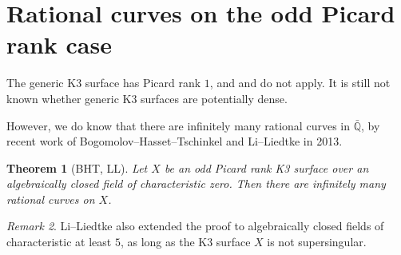 \documentclass{amsart}
\theoremstyle{plain}
\newtheorem{theorem}{Theorem}[section]
\theoremstyle{definition}
\theoremstyle{remark}
\newtheorem{remark}[theorem]{Remark}
\begin{document}

\section{Rational curves on the odd Picard rank case} %
\label{sec:rational_curves_on_the_odd_picard_rank_case}

The generic K3 surface has Picard rank $1$, and  and 
 do not apply. It is still not known whether 
generic K3 surfaces are potentially dense.

However, we do know that there are infinitely many rational curves in $\bar{\mathbb{Q}}$,
by recent work of Bogomolov--Hasset--Tschinkel and Li--Liedtke in 2013.
\begin{theorem}[BHT, LL]
Let $X$ be an odd Picard rank K3 surface over an algebraically closed field of characteristic zero.
Then there are infinitely many rational curves on $X$.
\end{theorem}
\begin{remark}
Li--Liedtke also extended the proof to algebraically closed fields of characteristic at least $5$, as
long as the K3 surface $X$ is not supersingular.
\end{remark}
\end{document}
